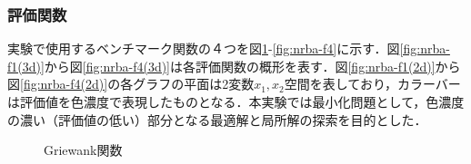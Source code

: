 \documentclass[a4j,11pt]{jarticle}
\begin{document}
\subsubsection{評価関数}
\label{sss:NRBA-func}
実験で使用するベンチマーク関数の４つを図\ref{fig:nrba-f1}-\ref{fig:nrba-f4}に示す．図\ref{fig:nrba-f1(3d)}から図\ref{fig:nrba-f4(3d)}は各評価関数の概形を表す．図\ref{fig:nrba-f1(2d)}から図\ref{fig:nrba-f4(2d)}の各グラフの平面は2変数$x_1,x_2$空間を表しており，カラーバーは評価値を色濃度で表現したものとなる．本実験では最小化問題として，色濃度の濃い（評価値の低い）部分となる最適解と局所解の探索を目的とした．

\begin{figure}[t]
\centering
{}
\caption{Griewank関数}
\label{fig:nrba-f1}
\end{figure}
\end{document}
